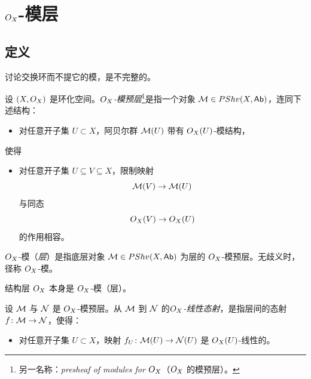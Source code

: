 
\section{$O_X$-模层}\label{sec:12}

\subsection{定义}\label{sec:12.1}

讨论交换环而不提它的模，是不完整的。

\begin{definition}\label{def:12.1.1}
设 $(X,O_X)$ 是环化空间。\emph{$O_X$-模预层}\footnote{另一名称：\emph{presheaf of modules for $O_X$}（$O_X$ 的模预层）。}是指一个对象 $\mathcal{M}\in PShv(X,\mathsf{Ab})$，连同下述结构：
\begin{itemize}
  \item 对任意开子集 $U\subset X$，阿贝尔群 $\mathcal{M}(U)$ 带有 $O_X(U)$-模结构，
\end{itemize}
使得
\begin{itemize}
  \item 对任意开子集 $U\subseteq V\subseteq X$，限制映射
  \[
  \mathcal{M}(V)\to\mathcal{M}(U)
  \]
  与同态
  \[
  O_X(V)\to O_X(U)
  \]
  的作用相容。
\end{itemize}
\end{definition}

$O_X$-模（\emph{层}）是指底层对象 $\mathcal{M}\in PShv(X,\mathsf{Ab})$ 为层的 $O_X$-模预层。无歧义时，径称 $O_X$-模。

\begin{example}\label{ex:12.1.2}
结构层 $O_X$ 本身是 $O_X$-模（层）。
\end{example}

\begin{definition}\label{def:12.1.3}
设 $\mathcal{M}$ 与 $\mathcal{N}$ 是 $O_X$-模预层。从 $\mathcal{M}$ 到 $\mathcal{N}$ 的\emph{$O_X$-线性态射}，是指层间的态射 $f\colon\mathcal{M}\to\mathcal{N}$，使得：
\begin{itemize}
  \item 对任意开子集 $U\subset X$，映射 $f_U\colon\mathcal{M}(U)\to\mathcal{N}(U)$ 是 $O_X(U)$-线性的。
\end{itemize}
\end{definition}

